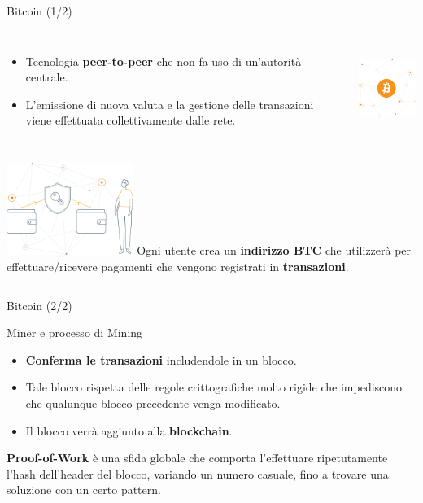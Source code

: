 \documentclass[]{beamer}
\begin{document}
\begin{frame}{Bitcoin (1/2)}
	
	\begin{columns}[c]
			\begin{itemize}
				\item Tecnologia \textbf{peer-to-peer} che non fa uso di un'autorità centrale.
				\item L'emissione di nuova valuta e la gestione delle transazioni viene effettuata collettivamente dalle rete.
			\end{itemize}
			\includegraphics[height=3cm]{img/bitcoin-img.png}
	\end{columns}

	\vspace{0.5cm}

	\begin{columns}[c]
			\includegraphics[height=3cm]{img/private-keys.png}
			Ogni utente crea un \textbf{indirizzo BTC} che utilizzerà per effettuare/ricevere pagamenti che vengono registrati in \textbf{transazioni}.
	\end{columns}
\end{frame}

\begin{frame}{Bitcoin (2/2)}
	\begin{block}{Miner e processo di Mining}
		\begin{itemize}
			\item \textbf{Conferma le transazioni} includendole in un blocco.
			\item Tale blocco rispetta delle regole crittografiche molto rigide che impediscono che qualunque blocco precedente venga modificato.
			\item Il blocco verrà aggiunto alla \textbf{blockchain}.
		\end{itemize}
		 
	\end{block}

	\vspace{0.5cm}

	\textbf{Proof-of-Work} è una sfida globale che comporta l'effettuare ripetutamente l'hash dell'header del blocco, variando un numero casuale, fino a trovare una soluzione con un certo pattern.
\end{frame}
\end{document}
